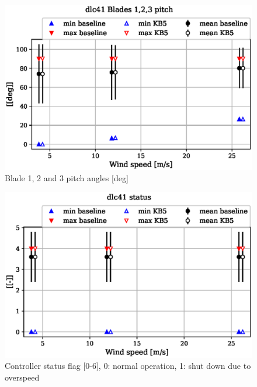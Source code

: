 \begin{figure}[!ht]
\begin{center}
	\includegraphics[width=.85\linewidth]{figures/baseline-vs-KB6/dlc41/bearing-pitch1-angle-deg_AA0007_AA0003.eps}
\end{center}
\caption{Blade 1, 2 and 3 pitch angles [deg]}
\label{fig:baseline-vs-KB6:dlc41:pitch}
\end{figure}

\begin{figure}[!ht]
\begin{center}
	\includegraphics[width=.85\linewidth]{figures/baseline-vs-KB6/dlc41/DLL-dtu_we_controller-inpvec-22_AA0007_AA0003.eps}
\end{center}
\caption{Controller status flag [0-6], 0: normal operation, 1: shut down due to overspeed}
\label{fig:baseline-vs-KB6:dlc41:status}
\end{figure}

